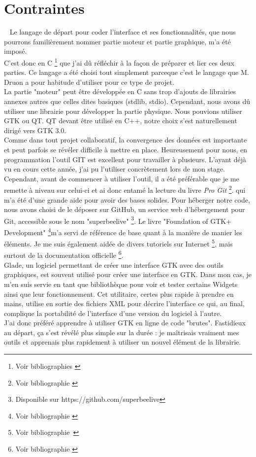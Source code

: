 \documentclass[11pt,french,a4paper]{report}
\begin{document}
    \section{Contraintes} 
Le langage de départ pour coder l'interface et ses fonctionnalités, que nous pourrons familièrement nommer partie moteur 
et partie graphique, m'a été imposé. \\
C'est donc en C \footnote{Voir bibliographies \cite{ref5} \cite{ref8}} que j'ai dû réfléchir à la façon de préparer et lier ces deux parties. Ce langage a été choisi tout simplement 
parceque c'est  le langage que M. Druon a pour habitude d'utiliser pour ce type de projet. \\
La partie "moteur" peut être développée en C sans trop d'ajouts de librairies annexes autres que celles dites basiques 
(stdlib, stdio). 
Cependant, nous avons dû utiliser une librairie pour développer la partie physique. Nous pouvions utiliser GTK ou QT. 
QT devant être utilisé en C++, notre choix s'est naturellement dirigé vers GTK 3.0. \\

Comme dans tout projet collaboratif, la convergence des données est importante et peut parfois se révéler difficile à mettre en place. 
Heureusement pour nous, en programmation l'outil GIT est excellent pour travailler à plusieurs. L'ayant déjà vu en cours cette année,
j'ai pu l'utiliser concrètement lors de mon stage. Cependant, avant de commencer à utiliser l'outil, il a été préférable que 
je me remette à niveau sur celui-ci et ai donc entamé la lecture du livre \textit{Pro Git} \footnote{Voir bibliographie \cite{ref7}}. 
qui m'a été d'une grande aide pour avoir des bases solides. Pour héberger notre code, nous avons choisi de le déposer sur GitHub,
un service web d'hébergement pour Git, accessible sous le nom "superbeelive" \footnote{Disponible sur https://github.com/superbeelive}.
Le livre "Foundation of GTK+ Development" \footnote{Voir bibliographie \cite{ref1}}m'a servi de référence de base quant à la manière de manier les éléments. 
Je me suis également aidée de divers tutoriels sur Internet \footnote{Voir bibliographie \cite{ref3}}, mais surtout de la documentation officielle \footnote{Voir bibliographie \cite{ref2}}. 
\\

Glade, un logiciel permettant de créer une interface GTK avec des outils graphiques, est souvent utilisé pour créer une interface
en GTK.
Dans mon cas, je m'en suis servie en tant que bibliothèque pour voir et tester certains Widgets ainsi que leur fonctionnement.
Cet utilitaire, certes plus rapide à prendre en mains, utilise en sortie des fichiers XML pour décrire l'interface ce qui, 
au final, complique la portabilité de l'interface d'une version du logiciel à l'autre. \\ 
J'ai donc préféré apprendre à utiliser GTK en ligne de code "brutes". Fastidieux au départ, 
ça s'est révélé plus simple sur la durée : je maîtrisais vraiment mes outils et apprenais plus rapidement à utiliser 
un nouvel élément de la librairie.  
\end{document}

